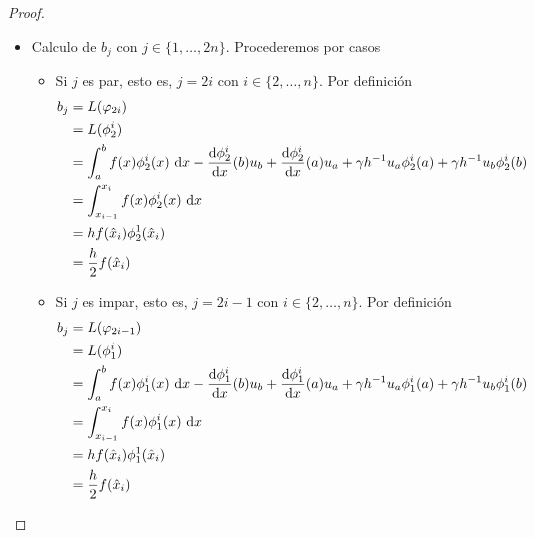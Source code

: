 \documentclass[10pt,a4paper]{report}
\newcommand{\dx}{\textup{d}x}
\providecommand{\Dx}[1]{\frac{\textup{d} #1}{\textup{d}x}}
\begin{document}
\begin{proof}
\begin{itemize}
\begin{align*}
        	&= \int_{x_{0}}^{x_{1}} f(x)\phi^{1}_{2}(x)\ \dx + \Dx{\phi^{1}_{2}}(x_{0})u_{a} \\
        	&= \int_{x_{0}}^{x_{1}} f(x)\phi^{1}_{2}(x)\ \dx +\frac{u_{a}}{h} \\
        	&= \int_{x_{0}}^{x_{1}} f(x)\phi^{1}_{2}(x)\ \dx + \frac{u_{a}c}{h}\\
        	&= hf(\hat{x}_{1})\phi^{1}_{2}(\hat{x}_{1})+ \frac{u_{a}}{h}\\
        	&= \frac{h}{2}f(\hat{x}_{1}) + \frac{u_{a}}{h}
        \end{align*}
        \item Calculo de $b_{j}$ con $j\in\{1,\dots,2n\}$. Procederemos por casos
        \begin{itemize}
        	\item Si $j$ es par, esto es, $j = 2i$ con $i\in\{2,\dots,n\}$. Por definición
        	\begin{align*}
        		b_{j} &= L(\varphi_{2i})\\ 
        		&= L(\phi^{i}_{2})\\ 
        		&= \int_{a}^{b} f(x)\phi^{i}_{2}(x)\ \dx - \Dx{\phi^{i}_{2}}(b)u_{b} + \Dx{\phi^{i}_{2}}(a)u_{a} + \gamma h^{-1}u_{a}\phi^{i}_{2}(a) + \gamma h^{-1}u_{b}\phi^{i}_{2}(b)\\
        		&= \int_{x_{i-1}}^{x_{i}} f(x)\phi^{i}_{2}(x)\ \dx \\
        		&= hf(\hat{x}_{i})\phi^{1}_{2}(\hat{x}_{i})\\
        		&= \frac{h}{2}f(\hat{x}_{i}) 
        	\end{align*}
            \item Si $j$ es impar, esto es, $j = 2i-1$ con $i\in\{2,\dots,n\}$. Por definición
            \begin{align*}
            	b_{j} &= L(\varphi_{2i-1})\\ 
            	&= L(\phi^{i}_{1})\\ 
            	&= \int_{a}^{b} f(x)\phi^{i}_{1}(x)\ \dx - \Dx{\phi^{i}_{1}}(b)u_{b} + \Dx{\phi^{i}_{1}}(a)u_{a} + \gamma h^{-1}u_{a}\phi^{i}_{1}(a) + \gamma h^{-1}u_{b}\phi^{i}_{1}(b)\\
            	&= \int_{x_{i-1}}^{x_{i}} f(x)\phi^{i}_{1}(x)\ \dx \\
            	&= hf(\hat{x}_{i})\phi^{1}_{1}(\hat{x}_{i})\\
            	&= \frac{h}{2}f(\hat{x}_{i}) 
            \end{align*}
        \end{itemize}

\end{itemize}
\end{proof}
\end{document}
